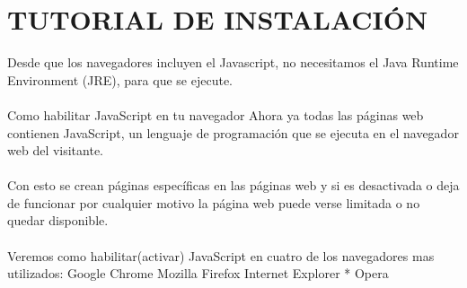 \documentclass[11pt]{article} %
\begin{document}
\section{TUTORIAL DE INSTALACIÓN}
 Desde que los navegadores incluyen el Javascript, no necesitamos el Java Runtime Environment (JRE), para que se ejecute.
\\  \\
Como habilitar JavaScript en tu navegador 
Ahora ya todas las páginas web contienen  JavaScript, un lenguaje de programación que se ejecuta en el navegador web del visitante. \\\\
Con esto se crean páginas específicas en las páginas web y si es desactivada o deja de funcionar por cualquier motivo la página web puede verse limitada o no quedar disponible.
\\\\
Veremos como habilitar(activar) JavaScript en cuatro de los navegadores mas utilizados:
\newline
\newline* Google Chrome
\newline* Mozilla Firefox
\newline* Internet Explorer
\newline
* Opera
\newpage
\end{document}
